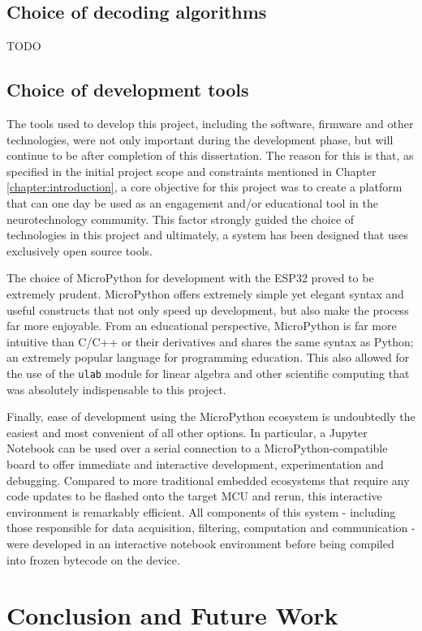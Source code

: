 \subsection{Choice of decoding algorithms}
TODO

\subsection{Choice of development tools}
The tools used to develop this project, including the software, firmware and other technologies, were not only important during the development phase, but will continue to be after completion of this dissertation. The reason for this is that, as specified in the initial project scope and constraints mentioned in Chapter \ref{chapter:introduction}, a core objective for this project was to create a platform that can one day be used as an engagement and/or educational tool in the neurotechnology community. This factor strongly guided the choice of technologies in this project and ultimately, a system has been designed that uses exclusively open source tools. 

The choice of MicroPython for development with the ESP32 proved to be extremely prudent. MicroPython offers extremely simple yet elegant syntax and useful constructs that not only speed up development, but also make the process far more enjoyable. From an educational perspective, MicroPython is far more intuitive than C/C++ or their derivatives and shares the same syntax as Python; an extremely popular language for programming education. This also allowed for the use of the \texttt{ulab} module for linear algebra and other scientific computing that was absolutely indispensable to this project.

Finally, ease of development using the MicroPython ecosystem is undoubtedly the easiest and most convenient of all other options. In particular, a Jupyter Notebook can be used over a serial connection to a MicroPython-compatible board to offer immediate and interactive development, experimentation and debugging. Compared to more traditional embedded ecosystems that require any code updates to be flashed onto the target MCU and rerun, this interactive environment is remarkably efficient. All components of this system - including those responsible for data acquisition, filtering, computation and communication - were developed in an interactive notebook environment before being compiled into frozen bytecode on the device.


\section{Conclusion and Future Work}


